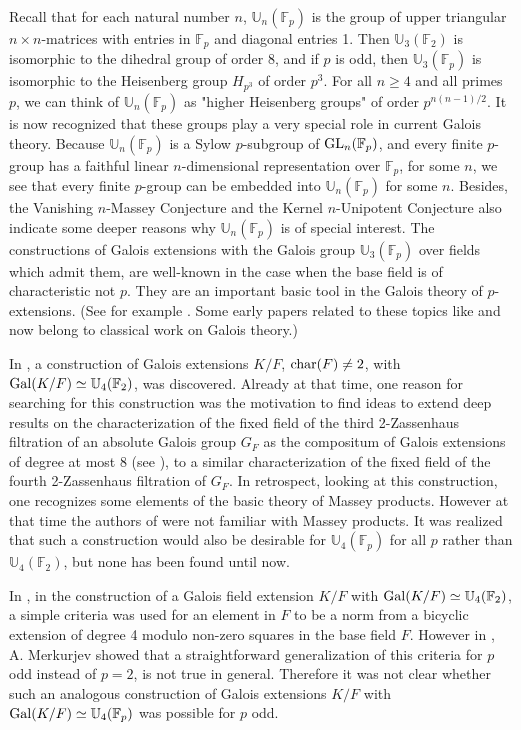 \documentclass[12pt,leqno]{amsart}
\theoremstyle{plain}
\theoremstyle{definition}
\newcommand{\F}{{\mathbb F}}
\newcommand{\U}{{\mathbb U}}
\begin{document}
Recall that for each natural number $n$, $\U_n(\F_p)$ is the group of upper triangular $n\times n$-matrices with entries in $\F_p$ and diagonal entries 1. Then $\U_3(\F_2)$ is isomorphic to the  dihedral group of order 8, and if $p$ is odd, then $\U_3(\F_p)$ is isomorphic to the Heisenberg group $H_{p^3}$ of order $p^3$. For all $n\geq 4$ and all primes $p$, we can think of $\U_n(\F_p)$ as "higher Heisenberg groups" of order $p^{n(n-1)/2}$.
 It is now recognized that these groups play a very special role in  current Galois theory. Because $\U_n(\F_p)$ is a Sylow $p$-subgroup of ${\rm GL}_n(\F_p)$, and every finite $p$-group has a faithful linear $n$-dimensional representation   over $\F_p$, for some $n$, we see that every finite $p$-group can be embedded into $\U_n(\F_p)$ for some $n$. Besides, the Vanishing $n$-Massey Conjecture and the Kernel $n$-Unipotent Conjecture also indicate some deeper reasons why $\U_n(\F_p)$ is of special interest. 
 The constructions of Galois extensions with the Galois group $\U_3(\F_p)$ over fields which admit them, are well-known in the case when the base field is of characteristic not $p$. They are an important basic  tool in the Galois theory of $p$-extensions. (See for example \cite[Sections 6.5 and 6.6]{JLY}. Some early papers related to these topics like 
\cite{MNg} and \cite{M} now belong to classical work on Galois theory.)
 
  In \cite[Section 4]{GLMS},  a construction of Galois extensions $K/F$, ${\rm char}(F)\not=2$, with ${\rm Gal}(K/F)\simeq \U_4(\F_2)$, was discovered. Already at that time, one reason for searching for this construction was the motivation to find ideas to extend deep results on the characterization of  the fixed field  of the third 2-Zassenhaus filtration of an absolute Galois group $G_F$ as the compositum of Galois extensions of degree at most 8 (see \cite{Ef, EM2, MSp,Vi}), to a similar characterization of the fixed field of the fourth 2-Zassenhaus filtration of $G_F$. 
 In retrospect, looking at this construction, one recognizes some elements of the basic theory of Massey products. However at that time the authors of \cite{GLMS} were not familiar with Massey products. It was realized that such a construction would also be desirable  for $\U_4(\F_p)$ for all $p$ rather than $\U_4(\F_2)$, but none has been found until now. 
 
 In \cite{GLMS}, in the construction of a Galois field extension $K/F$ with ${\rm Gal}(K/F)\simeq \U_4(\F_2)$, a simple criteria    was used  for an element in $F$ to be a norm  from a bicyclic  extension of degree 4 modulo non-zero squares in the base field $F$.  However  in \cite{Me},  A. Merkurjev showed that a straightforward generalization of this criteria for $p$ odd instead of $p=2$, is not true in general. 
Therefore it was not clear whether such an \mbox{analogous} construction of Galois extensions $K/F$ with ${\rm Gal}(K/F)\simeq \U_4(\F_p)$ was possible for $p$ odd.
 
\end{document}
